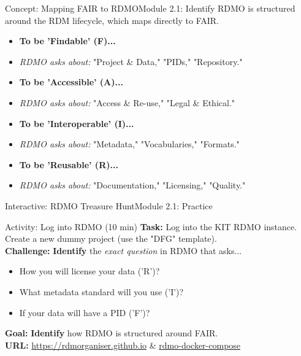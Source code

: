 \begin{frame}{Concept: Mapping FAIR to RDMO}{Module 2.1: Identify}
    RDMO is structured around the RDM lifecycle, which maps directly to FAIR.
    
    \begin{itemize}
        \item \textbf{To be 'Findable' (F)...}
        \pause
        \item \textit{RDMO asks about:} "Project \& Data," "PIDs," "Repository."
        \pause
        \item \textbf{To be 'Accessible' (A)...}
        \pause
        \item \textit{RDMO asks about:} "Access \& Re-use," "Legal \& Ethical."
        \pause
        \item \textbf{To be 'Interoperable' (I)...}
        \pause
        \item \textit{RDMO asks about:} "Metadata," "Vocabularies," "Formats."
        \pause
        \item \textbf{To be 'Reusable' (R)...}
        \pause
        \item \textit{RDMO asks about:} "Documentation," "Licensing," "Quality."
    \end{itemize}
\end{frame}

\begin{frame}{Interactive: RDMO Treasure Hunt}{Module 2.1: Practice}
    \begin{block}{Activity: Log into RDMO (10 min)}
        \textbf{Task:} Log into the KIT RDMO instance. Create a new dummy project (use the "DFG" template).\\
        \pause
        \textbf{Challenge:} \textbf{Identify} the \textit{exact question} in RDMO that asks...
        \begin{itemize}
            \item How you will license your data ('R')?
            \item What metadata standard will you use ('I')?
            \item If your data will have a PID ('F')?
        \end{itemize}
        \pause
        \textbf{Goal:} \textbf{Identify} how RDMO is structured around FAIR. \\
        \textbf{URL:} \href{https://rdmorganiser.github.io}{https://rdmorganiser.github.io} \& \href{https://github.com/rdmorganiser/rdmo-docker-compose}{rdmo-docker-compose}
    \end{block}
\end{frame}


